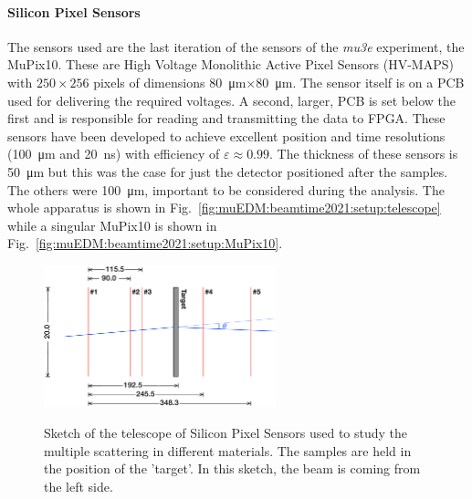 \begin{refsection}
        \paragraph{Silicon Pixel Sensors}
        The sensors used are the last iteration of the sensors of the \textit{mu3e} experiment, the MuPix10. 
        These are High Voltage Monolithic Active Pixel Sensors (HV-MAPS) with $250\times256$ pixels of dimensions \SI{80}{\micro m}$\times$\SI{80}{\micro m}. 
        The sensor itself is on a PCB used for delivering the required voltages.
        A second, larger, PCB is set below the first and is responsible for reading and transmitting the data to FPGA.
        These sensors have been developed to achieve excellent position and time resolutions (\SI{100}{\micro m} and \SI{20}{ns}) with efficiency of $\varepsilon \approx 0.99$. 
        The thickness of these sensors is \SI{50}{\micro m} but this was the case for just the detector positioned after the samples. 
        The others were \SI{100}{\micro m}, important to be considered during the analysis.
        The whole apparatus is shown in Fig.~\ref{fig:muEDM:beamtime2021:setup:telescope} while a singular MuPix10 is shown in Fig.~\ref{fig:muEDM:beamtime2021:setup:MuPix10}.
        
        \begin{figure}
            \centering
            \includegraphics[width=0.6\textwidth]{Figures/muEDM_Dec2021/Positions_Telescope.png}\\
            \caption{Sketch of the telescope of Silicon Pixel Sensors used to study the multiple scattering in different materials.
            The samples are held in the position of the 'target'. 
            In this sketch, the beam is coming from the left side.}
            \label{fig:muEDM:beamtime2021:telescope}
        \end{figure}


\end{refsection}
